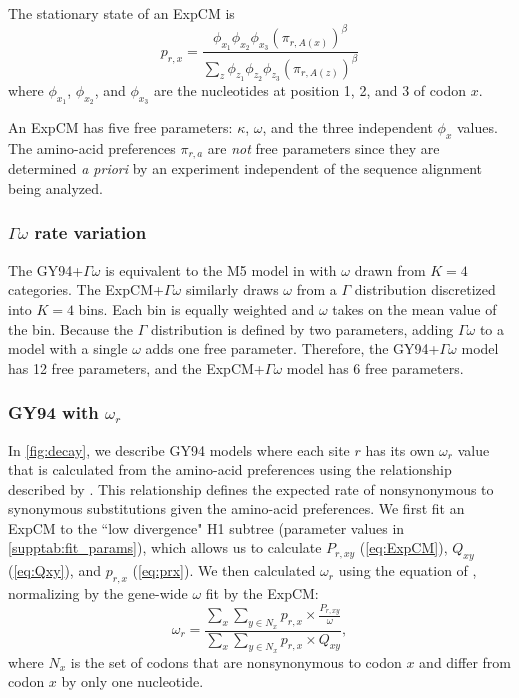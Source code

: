 \documentclass[11pt]{article}
\begin{document}
The stationary state of an ExpCM is 
\begin{equation}
\label{eq:prx}
p_{r,x} = \frac{\phi_{x_1}\phi_{x_2}\phi_{x_3}\left(\pi_{r,A\left(x\right)}\right)^\beta}{\sum_z \phi_{z_1}\phi_{z_2}\phi_{z_3}\left(\pi_{r,A\left(z\right)}\right)^\beta}
\end{equation}
where $\phi_{x_1}$, $\phi_{x_2}$, and $\phi_{x_3}$ are the nucleotides at position 1, 2, and 3 of codon $x$. 

An ExpCM has five free parameters: $\kappa$, $\omega$, and the three independent $\phi_x$ values.
The amino-acid preferences $\pi_{r,a}$ are \emph{not} free parameters since they are determined \textit{a priori} by an experiment independent of the sequence alignment being analyzed.

\subsubsection*{$\Gamma\omega$ rate variation}

The GY94+$\Gamma\omega$ is equivalent to the M5 model in \citet{yang2000codon} with $\omega$ drawn from $K = 4$ categories.
The ExpCM+$\Gamma\omega$ similarly draws $\omega$ from a $\Gamma$ distribution discretized into $K=4$ bins. 
Each bin is equally weighted and $\omega$ takes on the mean value of the bin. 
Because the $\Gamma$ distribution is defined by two parameters, adding $\Gamma\omega$ to a model with a single $\omega$ adds one free parameter.
Therefore, the GY94+$\Gamma\omega$ model has 12 free parameters, and the ExpCM+$\Gamma\omega$ model has 6 free parameters.

\subsubsection*{GY94 with $\omega_r$}
In \ref{fig:decay}, we describe GY94 models where each site $r$ has its own $\omega_r$ value that is calculated from the amino-acid preferences using the relationship described by \citet{spielman2015relationship}.
This relationship defines the expected rate of nonsynonymous to synonymous substitutions given the amino-acid preferences.
We first fit an ExpCM to the ``low divergence" H1 subtree (parameter values in \ref{supptab:fit_params}), which allows us to calculate $P_{r,xy}$ (\ref{eq:ExpCM}), $Q_{xy}$ (\ref{eq:Qxy}), and $p_{r,x}$ (\ref{eq:prx}).
We then calculated $\omega_r$ using the equation of \citet{spielman2015relationship}, normalizing by the gene-wide $\omega$ fit by the ExpCM:
\begin{equation}
\label{eq:w_r}
\omega_{r} = \frac{\sum_{x} \sum_{y \in N_x} {p_{r,x} \times \frac{P_{r,xy}}{\omega}}}{\sum_{x} \sum_{y \in N_x} {p_{r,x} \times Q_{xy}}},
\end{equation}
where $N_x$ is the set of codons that are nonsynonymous to codon $x$ and differ from codon $x$ by only one nucleotide. 
\end{document}
